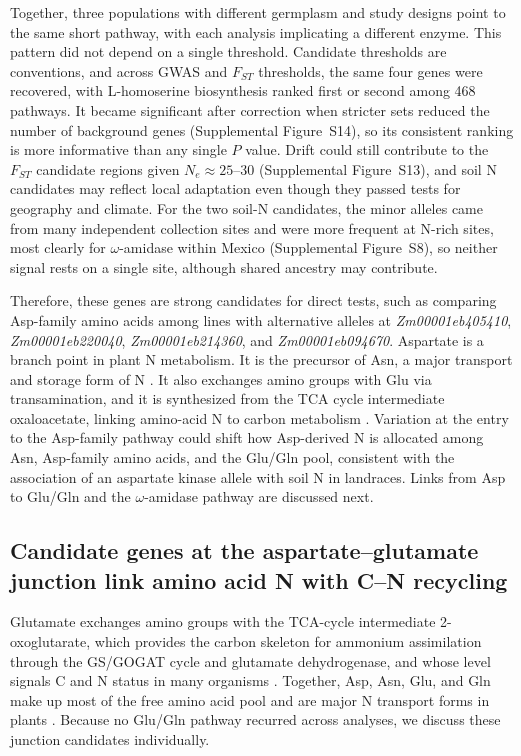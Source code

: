 \documentclass[namedate,unnumsec,webpdf,contemporary,large]{oup-authoring-template}
\begin{document}
Together, three populations with different germplasm and study designs point to the same short pathway, with each analysis implicating a different enzyme. This pattern did not depend on a single threshold. Candidate thresholds are conventions, and across GWAS and $F_{ST}$ thresholds, the same four genes were recovered, with L-homoserine biosynthesis ranked first or second among 468 pathways. It became significant after correction when stricter sets reduced the number of background genes (Supplemental Figure~S14), so its consistent ranking is more informative than any single $P$ value. Drift could still contribute to the $F_{ST}$ candidate regions given $N_e \approx 25$--30 (Supplemental Figure~S13), and soil N candidates may reflect local adaptation even though they passed tests for geography and climate. For the two soil-N candidates, the minor alleles came from many independent collection sites and were more frequent at N-rich sites, most clearly for $\omega$-amidase within Mexico (Supplemental Figure~S8), so neither signal rests on a single site, although shared ancestry may contribute. 

Therefore, these genes are strong candidates for direct tests, such as comparing Asp-family amino acids among lines with alternative alleles at \textit{Zm00001eb405410}, \textit{Zm00001eb220040}, \textit{Zm00001eb214360}, and \textit{Zm00001eb094670}. Aspartate is a branch point in plant N metabolism. It is the precursor of Asn, a major transport and storage form of N \citep{Lea2007Asparagine}. It also exchanges amino groups with Glu via transamination, and it is synthesized from the TCA cycle intermediate oxaloacetate, linking amino-acid N to carbon metabolism \citep{Han2021Aspartate}. Variation at the entry to the Asp-family pathway could shift how Asp-derived N is allocated among Asn, Asp-family amino acids, and the Glu/Gln pool, consistent with the association of an aspartate kinase allele with soil N in landraces. Links from Asp to Glu/Gln and the $\omega$-amidase pathway are discussed next.

\subsection{Candidate genes at the aspartate--glutamate junction link amino acid N with C--N recycling}

Glutamate exchanges amino groups with the TCA-cycle intermediate 2-oxoglutarate, which provides the carbon skeleton for ammonium assimilation through the GS/GOGAT cycle and glutamate dehydrogenase, and whose level signals C and N status in many organisms \citep{Huergo2015TwoOG}. Together, Asp, Asn, Glu, and Gln make up most of the free amino acid pool and are major N transport forms in plants \citep{McAllister2016AAT}. Because no Glu/Gln pathway recurred across analyses, we discuss these junction candidates individually.
\end{document}
